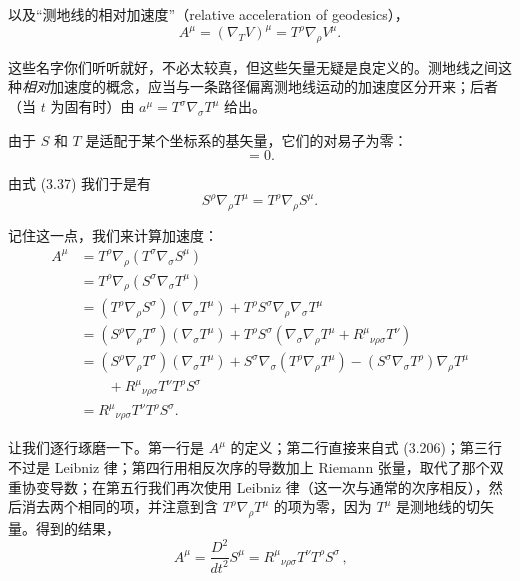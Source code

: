 以及“测地线的相对加速度”（relative acceleration of geodesics），
\begin{equation*}
A^{\mu} = (\nabla_{T}V)^{\mu} = T^{\rho}\nabla_{\rho}V^{\mu}.
\tag{3.204}
\end{equation*}

这些名字你们听听就好，不必太较真，但这些矢量无疑是良定义的。测地线之间这种\emph{相对}加速度的概念，应当与一条路径偏离测地线运动的加速度区分开来；后者（当 $t$ 为固有时）由 $a^{\mu} = T^{\sigma}\nabla_{\sigma}T^{\mu}$ 给出。

由于 $S$ 和 $T$ 是适配于某个坐标系的基矢量，它们的对易子为零：
\begin{equation*}
[S, T] = 0.
\tag{3.205}
\end{equation*}

由式 (3.37) 我们于是有
\begin{equation*}
S^{\rho}\nabla_{\rho}T^{\mu} = T^{\rho}\nabla_{\rho}S^{\mu}.
\tag{3.206}
\end{equation*}

记住这一点，我们来计算加速度：
\begin{align*}
A^{\mu} &= T^{\rho}\nabla_{\rho}(T^{\sigma}\nabla_{\sigma}S^{\mu})\\
&= T^{\rho}\nabla_{\rho}(S^{\sigma}\nabla_{\sigma}T^{\mu})\\
&= (T^{\rho}\nabla_{\rho}S^{\sigma})(\nabla_{\sigma}T^{\mu}) + T^{\rho}S^{\sigma}\nabla_{\rho}\nabla_{\sigma}T^{\mu}\\
&= (S^{\rho}\nabla_{\rho}T^{\sigma})(\nabla_{\sigma}T^{\mu}) + T^{\rho}S^{\sigma}(\nabla_{\sigma}\nabla_{\rho}T^{\mu} + R^{\mu}{}_{\nu\rho\sigma}T^{\nu})\\
&= (S^{\rho}\nabla_{\rho}T^{\sigma})(\nabla_{\sigma}T^{\mu}) + S^{\sigma}\nabla_{\sigma}(T^{\rho}\nabla_{\rho}T^{\mu}) - (S^{\sigma}\nabla_{\sigma}T^{\rho})\nabla_{\rho}T^{\mu}\\
&\qquad + R^{\mu}{}_{\nu\rho\sigma}T^{\nu}T^{\rho}S^{\sigma}\\
&= R^{\mu}{}_{\nu\rho\sigma}T^{\nu}T^{\rho}S^{\sigma}.
\tag{3.207}
\end{align*}

让我们逐行琢磨一下。第一行是 $A^{\mu}$ 的定义；第二行直接来自式 (3.206)；第三行不过是 Leibniz 律；第四行用相反次序的导数加上 Riemann 张量，取代了那个双重协变导数；在第五行我们再次使用 Leibniz 律（这一次与通常的次序相反），然后消去两个相同的项，并注意到含 $T^{\rho}\nabla_{\rho}T^{\mu}$ 的项为零，因为 $T^{\mu}$ 是测地线的切矢量。得到的结果，
\begin{equation*}
\boxed{\,A^{\mu} = \frac{D^{2}}{dt^{2}}S^{\mu} = R^{\mu}{}_{\nu\rho\sigma}T^{\nu}T^{\rho}S^{\sigma}\,,}
\tag{3.208}
\end{equation*}

